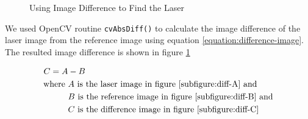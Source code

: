\begin{figure}[ht!]
\centering
{} \hfill
{} \hfill
{} \hfill
\caption{Using Image Difference to Find the Laser}
\label{figure:difference-image}
\end{figure}

We used OpenCV routine \texttt{cvAbsDiff()} to calculate the image difference
of the laser image from the reference image using equation
\ref{equation:difference-image}. The resulted image difference is shown in
figure \ref{figure:difference-image}

\begin{align}
\label{equation:difference-image}
C = A &- B \\
\text{where}~
&A~ \text{is the laser image in figure \ref{subfigure:diff-A} and} \notag \\
&B~ \text{is the reference image in figure \ref{subfigure:diff-B} and} \notag \\
&C~ \text{is the difference image in figure \ref{subfigure:diff-C}} \notag
\end{align}

